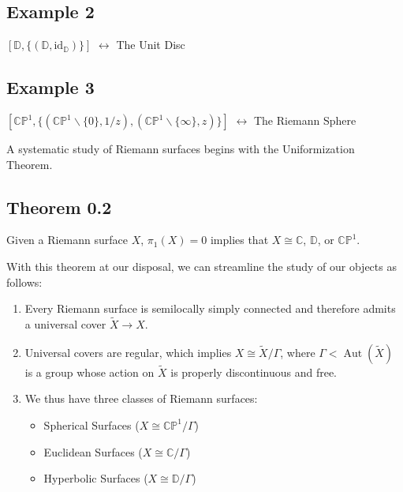 \documentclass[11pt,a4paper]{article}
\begin{document}
\subsection*{Example 2} $[\mathbb{D}, \{(\mathbb{D}, \text{id}_{\mathbb{D}})\}]$ $\longleftrightarrow$ The Unit Disc

\subsection*{Example 3}
    $[\mathbb{CP}^1, \{(\mathbb{CP}^1\backslash \{0\}, 1/z), (\mathbb{CP}^1\backslash \{\infty\}, z)\}]$ $\longleftrightarrow$ The Riemann Sphere


A systematic study of Riemann surfaces begins with the Uniformization Theorem.

\subsection*{Theorem 0.2}
    Given a Riemann surface $X$, $\pi_1(X) = 0$ implies that $X \cong \mathbb{C}$, $\mathbb{D}$, or $\mathbb{CP}^1$.


With this theorem at our disposal, we can streamline the study of our objects as follows:
\begin{enumerate}
    \item Every Riemann surface is semilocally simply connected and therefore admits a universal cover $\widetilde{X} \rightarrow X$.
    \item Universal covers are regular, which implies $X\cong \widetilde{X}/\Gamma$, where $\Gamma<\operatorname{Aut}(\widetilde X)$ is a group whose action on $\widetilde X$ is properly discontinuous and free.
    \item We thus have three classes of Riemann surfaces:
    \begin{itemize}
        \item Spherical Surfaces ($X\cong \mathbb{CP}^1/\Gamma$)
        \item Euclidean Surfaces ($X\cong \mathbb{C}/\Gamma$)
        \item Hyperbolic Surfaces ($X\cong \mathbb{D}/\Gamma$)
    \end{itemize}
\end{enumerate}
\end{document}
